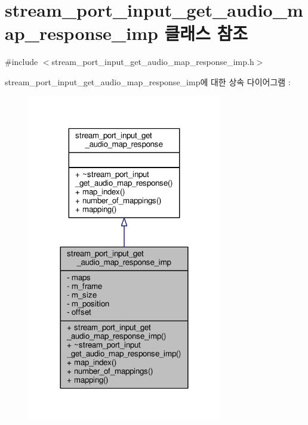 \hypertarget{classavdecc__lib_1_1stream__port__input__get__audio__map__response__imp}{}\section{stream\+\_\+port\+\_\+input\+\_\+get\+\_\+audio\+\_\+map\+\_\+response\+\_\+imp 클래스 참조}
\label{classavdecc__lib_1_1stream__port__input__get__audio__map__response__imp}


{\ttfamily \#include $<$stream\+\_\+port\+\_\+input\+\_\+get\+\_\+audio\+\_\+map\+\_\+response\+\_\+imp.\+h$>$}



stream\+\_\+port\+\_\+input\+\_\+get\+\_\+audio\+\_\+map\+\_\+response\+\_\+imp에 대한 상속 다이어그램 \+: 
\nopagebreak
\begin{figure}[H]
\begin{center}
\leavevmode
\includegraphics[width=240pt]{classavdecc__lib_1_1stream__port__input__get__audio__map__response__imp__inherit__graph}
\end{center}
\end{figure}


